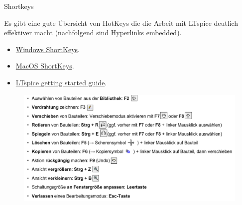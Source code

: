 \documentclass{beamer}
\begin{document}
\begin{frame}[t]{Shortkeys}

  Es gibt eine gute Übersicht von HotKeys die die Arbeit mit LTspice deutlich effektiver macht (nachfolgend sind Hyperlinks embedded).

  \begin{itemize}
    \item \href{https://www.analog.com/media/en/simulation-models/spice-models/LTspice_ShortcutFlyer.pdf?modelType=spice-models}{Windows ShortKeys}.
    \item \href{https://www.analog.com/media/en/simulation-models/spice-models/LTspiceShortcutsForMacOSX.pdf?modelType=spice-models}{MacOS ShortKeys}.
    \item \href{https://www.analog.com/media/en/simulation-models/spice-models/LTspiceGettingStartedGuide.pdf?modelType=spice-models}{LTspice getting started guide}.
  \end{itemize}

  \begin{figure}
    \centering
    \includegraphics[scale=0.25]{pictures/shortkeys.png}
  \end{figure}

\end{frame}
\end{document}
